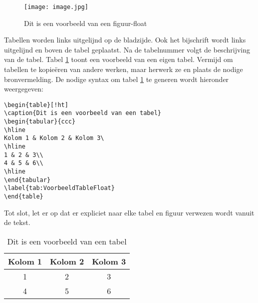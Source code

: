  
 \begin{figure}[!ht]
 	\centering
 	\texttt{[image: image.jpg]}
 	\caption{Dit is een voorbeeld van een figuur-float}
 	\label{fig:VoorbeeldFigFloat}
 \end{figure}

Tabellen worden links uitgelijnd op de bladzijde. Ook het bijschrift wordt links uitgelijnd en boven de tabel geplaatst. Na de tabelnummer volgt de beschrijving van de tabel. Tabel \ref{tab:VoorbeeldTableFloat} toont een voorbeeld van een eigen tabel. Vermijd om tabellen te kopie\"eren van andere werken, maar herwerk ze en plaats de nodige bronvermelding. De nodige syntax om tabel \ref{tab:VoorbeeldTableFloat} te generen wordt hieronder weergegeven:

\verb|\begin{table}[!ht]|\\
\verb|\caption{Dit is een voorbeeld van een tabel}|\\
\verb|\begin{tabular}{ccc}|\\
\verb|\hline|\\
\verb|Kolom 1 & Kolom 2 & Kolom 3\|\\
\verb|\hline|\\
\verb|1 & 2 & 3\\|\\
\verb|4 & 5 & 6\\|\\
\verb|\hline|\\
\verb|\end{tabular}|\\
\verb|\label{tab:VoorbeeldTableFloat}|\\
\verb|\end{table}|

Tot slot, let er op dat er expliciet naar elke tabel en figuur verwezen wordt vanuit de tekst. 

\begin{table}[!ht]
		\caption{Dit is een voorbeeld van een tabel}
	\begin{tabular}{ccc}
		\hline
		Kolom 1 & Kolom 2 & Kolom 3\\
		\hline
		1 & 2 & 3\\
		4 & 5 & 6\\
		\hline
	\end{tabular}
\label{tab:VoorbeeldTableFloat}
\end{table}